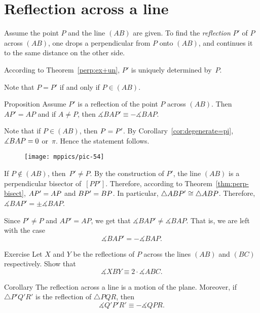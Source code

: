 \section*{Reflection across a line}

Assume the point $P$ and the line $(AB)$ are given.
To find the \emph{reflection} $P'$ of $P$ across $(AB)$,
one drops a perpendicular from $P$ onto $(AB)$, 
and continues it to the same distance on the other side.

According to Theorem~\ref{perp:ex+un}, $P'$ is uniquely determined by~$P$.

Note that $P=P'$ if and only if $P\in(AB)$.

\begin{thm}[\abs]{Proposition}\label{prop:reflection}
Assume $P'$ is a reflection of the point $P$ across $(AB)$.
Then $AP'=AP$ 
and if $A\ne P$, 
then
$\measuredangle BAP'\equiv -\measuredangle BAP$.
\end{thm}

Note that if $P\in (AB)$, 
then $P\z=P'$. 
By Corollary~\ref{cor:degenerate=pi}, $\measuredangle BAP\z=0$ or~$\pi$.
Hence the statement follows.

{

\begin{wrapfigure}{o}{37mm}
\vskip-2mm
\centering
\texttt{[image: mppics/pic-54]}
\end{wrapfigure}

If $P\notin (AB)$, then~$P'\ne P$.
By the construction of $P'$, 
the line $(AB)$ is a perpendicular bisector of~$[PP']$.
Therefore, according to Theorem~\ref{thm:perp-bisect}, $AP'\z=AP$ and $BP'\z=BP$.
In particular, 
$\triangle ABP'\z\cong \triangle ABP$.
Therefore, $\measuredangle BAP'=\pm \measuredangle BAP$.

Since $P'\ne P$ and $AP'=AP$,
we get that $\measuredangle BAP'\ne \measuredangle BAP$.
That is, we are left with the case
$$\measuredangle BAP'=-\measuredangle BAP.$$
\qedsf

}

\begin{thm}{Exercise}\label{ex:2-reflections}
Let $X$ and $Y$ be the reflections of $P$ across the lines $(AB)$ and $(BC)$ respectively.
Show that 
$$\measuredangle XBY\equiv 2\cdot \measuredangle ABC.$$

\end{thm}


\begin{thm}[\abs]{Corollary}\label{cor:reflection+angle}
The reflection across a line is a motion of the plane. 
Moreover, if $\triangle P'Q'R'$ is the reflection of $\triangle PQR$,
then 
$$\measuredangle Q'P'R'\equiv -\measuredangle QPR.$$

\end{thm}


